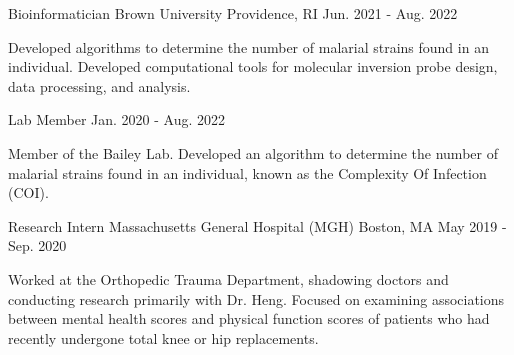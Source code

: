 
\begin{cventries}

\vspace{-1mm}
  \cventry
    {Bioinformatician} %
    {Brown University} %
    {Providence, RI} %
    {Jun. 2021 - Aug. 2022} %
    {
      \begin{cvitems} %
        \item {Developed algorithms to determine the number of malarial strains found in an individual. Developed computational tools for molecular inversion probe design, data processing, and analysis.}
      \end{cvitems}
    }

\vspace{-1mm}

\cventry
    {Lab Member} %
    {} %
    {} %
    {Jan. 2020 - Aug. 2022} %
    {
      \begin{cvitems} %
        \item {Member of the Bailey Lab. Developed an algorithm to determine the number of malarial strains found in an individual, known as the Complexity Of Infection (COI).}
      \end{cvitems}
    }

\vspace{-1mm}
  \cventry
    {Research Intern} %
    {Massachusetts General Hospital (MGH)} %
    {Boston, MA} %
    {May 2019 - Sep. 2020} %
    {
      \begin{cvitems} %
        \item {Worked at the Orthopedic Trauma Department, shadowing doctors and conducting research primarily with Dr. Heng. Focused on examining associations between mental health scores and physical function scores of patients who had recently undergone total knee or hip replacements.}
      \end{cvitems}
    }


\end{cventries}
